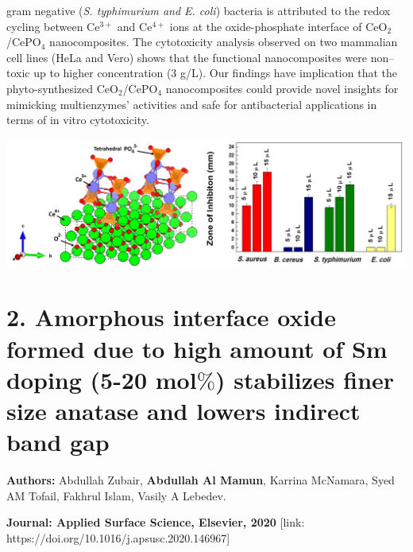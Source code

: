 \documentclass[a4paper,20pt]{article}
\begin{document}
    \begin{minipage}{.48\linewidth} \begin{flushleft}
    
    		   gram negative (\textit{S. typhimurium and E. coli}) bacteria is attributed to the redox cycling between Ce$^{3+}$ and Ce$^{4+}$ ions at the oxide-phosphate interface of CeO$_2$/CePO$_4$ nanocomposites. The cytotoxicity analysis observed on two mammalian cell lines (HeLa and Vero) shows that the functional nanocomposites were non–toxic up to higher concentration (3 g/L). Our findings have implication that the phyto-synthesized CeO$_2$/CePO$_4$ nanocomposites could provide novel insights for mimicking multienzymes’ activities and safe for antibacterial applications in terms of in vitro cytotoxicity. 
    	\end{flushleft} \end{minipage}
    \hfill 
    \begin{minipage}{0.5\linewidth}\begin{flushright}
    	 	\includegraphics[width=0.98\linewidth]{Picture1}\\
    	\end{flushright}\end{minipage}

\vspace{20pt}    	 

\section{\textbf{2. Amorphous interface oxide formed due to high amount of Sm doping (5-20 mol$\%$) stabilizes finer size anatase and lowers indirect band gap}}

\textbf{Authors:} Abdullah Zubair, \textbf{Abdullah Al Mamun}, Karrina McNamara, Syed AM Tofail, Fakhrul Islam, Vasily A Lebedev. \\ \vspace{3pt}

\textbf{Journal: Applied Surface Science, Elsevier, 2020} [link: https://doi.org/10.1016/j.apsusc.2020.146967] \\ \vspace{5pt}
\end{document}
